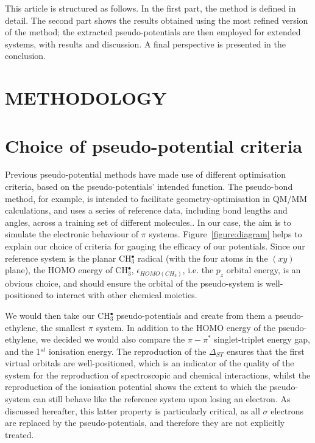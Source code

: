 \documentclass[12pt]{article}
\begin{document}
This article is structured as follows.
In the first part, the method is defined in detail.
The second part shows the results obtained using the most refined version of the method; the extracted pseudo-potentials are then employed for extended systems, with results and discussion. A final perspective is presented in the conclusion.

\section*{\sffamily \Large METHODOLOGY}

\section*{\sffamily \large Choice of pseudo-potential criteria \label{section:pseudocrit}} 

Previous pseudo-potential methods have made use of different optimisation criteria, based on the pseudo-potentials' intended function. 
The pseudo-bond method, for example, is intended to facilitate geometry-optimisation in QM/MM calculations, and uses a series of reference data, 
including bond lengths and angles, across a training set of different molecules.\cite{zhang_pseudobond_1998}.
In our case, the aim is to simulate the electronic behaviour of $\pi$ systems.
Figure~\ref{figure:diagram} helps to explain our choice of criteria for gauging the efficacy of our potentials. Since our reference system is the planar CH$_3^\bullet$ radical (with the four atoms in the $(xy)$ plane), the HOMO energy of CH$_3^{\bullet}$, $\epsilon_{HOMO(CH_3)}$, i.e. the $p_{z}$ orbital energy, is an obvious choice, and should ensure the orbital of the pseudo-system is well-positioned to interact with other chemical moieties.

We would then take our CH$_3^{\bullet}$ pseudo-potentials and create from them a pseudo-ethylene, the smallest $\pi$ system.
In addition to the HOMO energy of the pseudo-ethylene, we decided we would also compare the $\pi-\pi^{*}$ singlet-triplet energy gap, 
and the 1$^{st}$ ionisation energy. 
The reproduction of the $\Delta_{ST}$ ensures that the first virtual 
orbitals are well-positioned, which is an indicator of the quality of the system for the reproduction of spectroscopic and 
chemical interactions, whilst the reproduction of the ionisation potential shows the extent to which the pseudo-system 
can still behave like the reference system upon losing an electron. As discussed hereafter, this latter property is 
particularly critical, as all $\sigma$ electrons are replaced by the pseudo-potentials, and therefore
they are not explicitly treated. 
\end{document}
